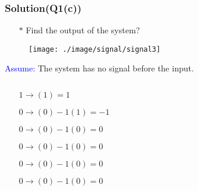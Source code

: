 \documentclass{beamer}
\newcommand{\blue}[1]{\textcolor{blue}{#1}}
\begin{document}

\begin{frame}
\frametitle{Solution(Q1(c))}

\begin{itemize} \itemsep1pt \parskip0pt 
  \item[$\ast$] Find the output of the system?
\end{itemize}
\begin{figure}[H]
  \centering
  \texttt{[image: ./image/signal/signal3]}
\end{figure}
\blue{Assume:} The system has no signal before the input.
\begin{columns}
\begin{column}{6 cm}
\begin{itemize} \itemsep1pt \parskip0pt 
  \item[] \hspace{5 mm}$1 $\hspace{2 mm}$\rightarrow $\hspace{2 mm}$(1) $\hspace{17 mm}$= 1$
  \item[] \hspace{5 mm}$0 $\hspace{2 mm}$\rightarrow $\hspace{2 mm}$(0) - 1(1) $\hspace{5.5 mm}$= -1$
  \item[] \hspace{5 mm}$0 $\hspace{2 mm}$\rightarrow $\hspace{2 mm}$(0) - 1(0) $\hspace{5.5 mm}$= 0$
  \item[] \hspace{5 mm}$0 $\hspace{2 mm}$\rightarrow $\hspace{2 mm}$(0) - 1(0) $\hspace{5.3 mm}$= 0$
  \item[] \hspace{5 mm}$0 $\hspace{2 mm}$\rightarrow $\hspace{2 mm}$(0) - 1(0) $\hspace{5 mm}$= 0$
  \item[] \hspace{5 mm}$0 $\hspace{2 mm}$\rightarrow $\hspace{2 mm}$(0) - 1(0) $\hspace{5 mm}$= 0$
\end{itemize}
\vspace{2.5 cm}
\end{column}


\end{columns}
\end{frame}
\end{document}
